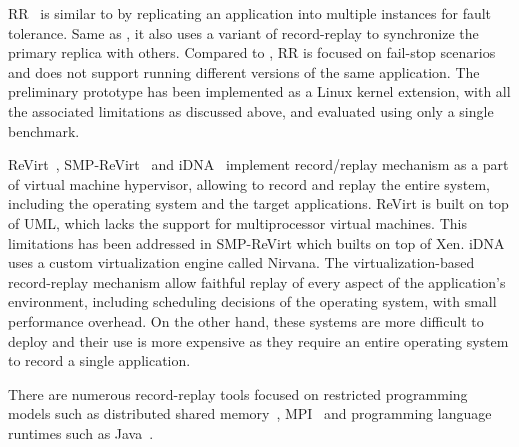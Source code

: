 RR~\cite{rr} is similar to \varan by replicating an application into multiple
instances for fault tolerance. Same as \varan, it also uses a variant of
record-replay to synchronize the primary replica with others. Compared
to \varan, RR is focused on fail-stop scenarios and does not support
running different versions of the same application. The preliminary prototype
has been implemented as a Linux kernel extension, with all the associated
limitations as discussed above, and evaluated using only a single benchmark.

ReVirt~\cite{revirt}, SMP-ReVirt~\cite{smp-revirt} and iDNA~\cite{idna}
implement record/replay mechanism as a part of virtual machine hypervisor,
allowing to record and replay the entire system, including the operating system
and the target applications. ReVirt is built on top of UML, which lacks the
support for multiprocessor virtual machines. This limitations has been addressed
in SMP-ReVirt which builts on top of Xen. iDNA uses a custom virtualization
engine called Nirvana. The virtualization-based record-replay mechanism allow
faithful replay of every aspect of the application's environment, including
scheduling decisions of the operating system, with small performance overhead.
On the other hand, these systems are more difficult to deploy and their use is
more expensive as they require an entire operating system to record a single
application.

There are numerous record-replay tools focused on restricted programming models
such as distributed shared memory~\cite{russinovich96}, MPI~\cite{rrmpi} and
programming language runtimes such as Java~\cite{choi98}.

